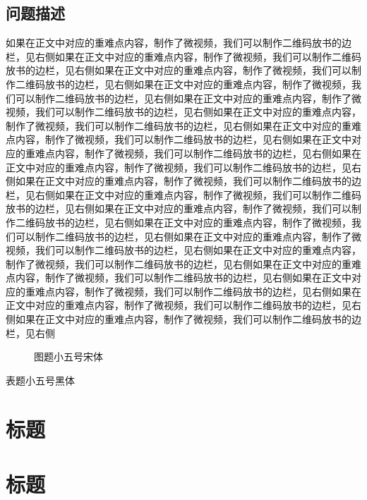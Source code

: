 \documentclass[fontset=windows,openany,UTF8]{ctexbook}
\begin{document}
\subsection{问题描述}
如果在正文中对应的重难点内容，制作了微视频，我们可以制作二维码放书的边栏，见右侧如果在正文中对应的重难点内容，制作了微视频，我们可以制作二维码放书的边栏，见右侧如果在正文中对应的重难点内容，制作了微视频，我们可以制作二维码放书的边栏，见右侧如果在正文中对应的重难点内容，制作了微视频，我们可以制作二维码放书的边栏，见右侧如果在正文中对应的重难点内容，制作了微视频，我们可以制作二维码放书的边栏，见右侧如果在正文中对应的重难点内容，制作了微视频，我们可以制作二维码放书的边栏，见右侧如果在正文中对应的重难点内容，制作了微视频，我们可以制作二维码放书的边栏，见右侧如果在正文中对应的重难点内容，制作了微视频，我们可以制作二维码放书的边栏，见右侧如果在正文中对应的重难点内容，制作了微视频，我们可以制作二维码放书的边栏，见右侧如果在正文中对应的重难点内容，制作了微视频，我们可以制作二维码放书的边栏，见右侧如果在正文中对应的重难点内容，制作了微视频，我们可以制作二维码放书的边栏，见右侧如果在正文中对应的重难点内容，制作了微视频，我们可以制作二维码放书的边栏，见右侧如果在正文中对应的重难点内容，制作了微视频，我们可以制作二维码放书的边栏，见右侧如果在正文中对应的重难点内容，制作了微视频，我们可以制作二维码放书的边栏，见右侧如果在正文中对应的重难点内容，制作了微视频，我们可以制作二维码放书的边栏，见右侧如果在正文中对应的重难点内容，制作了微视频，我们可以制作二维码放书的边栏，见右侧如果在正文中对应的重难点内容，制作了微视频，我们可以制作二维码放书的边栏，见右侧如果在正文中对应的重难点内容，制作了微视频，我们可以制作二维码放书的边栏，见右侧如果在正文中对应的重难点内容，制作了微视频，我们可以制作二维码放书的边栏，见右侧
\begin{figure}[h]
\centering\Huge {}
\caption{图题小五号宋体}
\end{figure}
\begin{table}[h]
\caption{表题小五号黑体}
\centering\Huge {}
\end{table}

\section{标题}

\section{标题}
\end{document}
